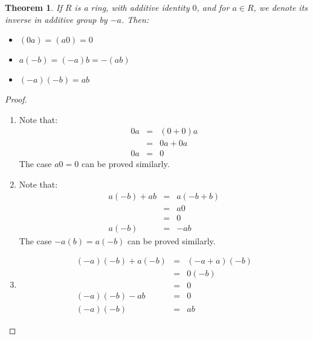 \documentclass{article}
\theoremstyle{MyNonumberplain}
\theoremstyle{break}
\newtheorem*{proof}{Proof. }
\theoremstyle{break}
\newtheorem{theorem}{Theorem}[section]
\theoremstyle{break}
\theoremstyle{definition}
\theoremstyle{break}
\begin{document}
\begin{thmbox}
    \begin{theorem}
        If $R$ is a ring, with additive identity $0$, and for $a \in R$, we denote its
        inverse in additive group by $- a$. Then:\bigskip
        \begin{itemize}
        \item $(0 a) = (a 0) = 0$\bigskip
        
        \item $a (- b) = (- a) b = - (a b)$\bigskip
        
        \item $(- a) (- b) = a b$
        \end{itemize}
    \end{theorem}
    \begin{prfbox}
        \begin{proof}
            \begin{enumerate}
                \item Note that:
                \begin{eqnarray*}
                  0 a & = & (0 + 0) a\\
                  & = & 0 a + 0 a\\
                  0 a & = & 0
                \end{eqnarray*}
                The case $a 0 = 0$ can be proved similarly.\bigskip

                \item Note that:
                \begin{eqnarray*}
                  a (- b) + a b & = & a (- b + b)\\
                  & = & a 0\\
                  & = & 0\\
                  a (- b) & = & - a b
                \end{eqnarray*}
                The case $- a (b) = a (- b)$ can be proved similarly.\bigskip

                \item
                \begin{eqnarray*}
                    (- a) (- b) + a (- b) & = & (- a + a) (- b)\\
                    & = & 0 (- b)\\
                    & = & 0\\
                    (- a) (- b) - a b & = & 0\\
                    (- a) (- b) & = & a b
                  \end{eqnarray*}
            \end{enumerate}
        \end{proof}
    \end{prfbox}
\end{thmbox}
\end{document}
